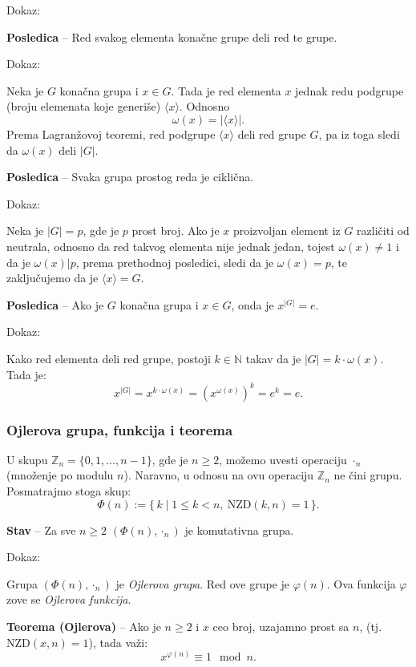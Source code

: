 \documentclass[a4paper,12pt]{article}
\newcommand{\f}[1]{\(#1\)}
\begin{document}
Dokaz:

\medskip
\textbf{Posledica} -- Red svakog elementa konačne grupe deli red te grupe.

Dokaz:

Neka je \f{G} konačna grupa i \f{x \in G}. Tada je red elementa \f{x} jednak redu podgrupe (broju elemenata koje generiše) \f{\langle x \rangle}.
Odnosno \[\omega(x) = |\langle x \rangle|.\] Prema Lagranžovoj teoremi, red podgrupe \f{\langle x \rangle} deli red grupe \f{G}, pa iz toga sledi da \f{\omega(x) \text{ deli } |G|}.

\medskip
\textbf{Posledica} -- Svaka grupa prostog reda je ciklična.

Dokaz:

Neka je \f{|G| = p}, gde je \f{p} prost broj. Ako je \f{x} proizvoljan element iz \f{G} različiti od neutrala,
odnosno da red takvog elementa nije jednak jedan, tojest \f{\omega(x) \neq 1} i da je \f{\omega(x) | p},
prema prethodnoj posledici, sledi da je \f{\omega(x) = p}, te zaključujemo da je \f{\langle x \rangle = G}.

\medskip
\textbf{Posledica} -- Ako je \f{G} konačna grupa i \f{x \in G}, onda je \f{x^{|G|} = e}.

Dokaz:

Kako red elementa deli red grupe, postoji \f{k \in \mathbb{N}} takav da je \f{|G| = k \cdot \omega(x)}. Tada je:
\[
x^{|G|} = x^{k \cdot \omega(x)} = (x^{\omega(x)})^k = e^k = e.
\]

\subsubsection{Ojlerova grupa, funkcija i teorema}

U skupu $\mathbb{Z}_n = \{0, 1, \dots, n-1\}$, gde je $n \ge 2$,
možemo uvesti operaciju $\cdot_n$ (množenje po modulu $n$).
Naravno, u odnosu na ovu operaciju $\mathbb{Z}_n$ ne čini grupu.
Posmatrajmo stoga skup:
\[
\Phi(n) := \{\, k \mid 1 \le k < n,\ \text{NZD}(k,n)=1 \,\}.
\]
\medskip

\textbf{Stav} -- Za sve $n \geq 2$ $(\Phi(n), \cdot_n)$ je
komutativna grupa.

\medskip
\noindent
Dokaz:

Grupa $(\Phi(n), \cdot_n)$ je \emph{Ojlerova grupa}.
Red ove grupe je $\varphi(n)$.
Ova funkcija $\varphi$ zove se \emph{Ojlerova funkcija}.

 \textbf{Teorema (Ojlerova)} -- Ako je \f{n \geq 2} i \f{x} ceo broj, uzajamno prost sa \f{n}, (tj. \f{\text{NZD}(x, n) = 1}), tada važi:
 \[
 x^{\varphi(n)} \equiv 1 \mod n.
  \]
\end{document}

